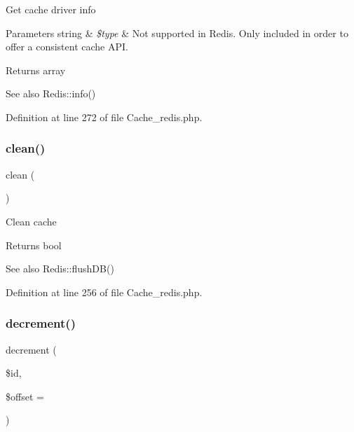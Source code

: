 Get cache driver info


\begin{DoxyParams}[1]{Parameters}
string & {\em \$type} & Not supported in Redis. Only included in order to offer a consistent cache A\+PI. \\
\hline
\end{DoxyParams}
\begin{DoxyReturn}{Returns}
array 
\end{DoxyReturn}
\begin{DoxySeeAlso}{See also}
Redis\+::info() 
\end{DoxySeeAlso}


Definition at line 272 of file Cache\+\_\+redis.\+php.

\mbox{\label{class_c_i___cache__redis_adb40b812890a8bc058bf6b7a0e1a54d9}} 
\subsubsection{\texorpdfstring{clean()}{clean()}}
{\footnotesize\ttfamily clean (\begin{DoxyParamCaption}{ }\end{DoxyParamCaption})}

Clean cache

\begin{DoxyReturn}{Returns}
bool 
\end{DoxyReturn}
\begin{DoxySeeAlso}{See also}
Redis\+::flush\+D\+B() 
\end{DoxySeeAlso}


Definition at line 256 of file Cache\+\_\+redis.\+php.

\mbox{\label{class_c_i___cache__redis_a4eb1c2772c8efc48c411ea060dd040b7}} 
\subsubsection{\texorpdfstring{decrement()}{decrement()}}
{\footnotesize\ttfamily decrement (\begin{DoxyParamCaption}\item[{}]{\$id,  }\item[{}]{\$offset = {} }\end{DoxyParamCaption})}


